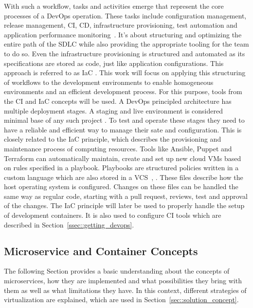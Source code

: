\documentclass[12pt, a4paper]{article}
\begin{document}
        \noindent With such a workflow, tasks and activities emerge that represent the core processes of a DevOps operation. These tasks include configuration management, release management, \ac{CI}, \ac{CD}, infrastructure provisioning, test automation and application performance monitoring~\cite{azuredevops}.  It's about structuring and optimizing the entire path of the \ac{SDLC} while also providing the appropriate tooling for the team to do so. Even the infrastructure provisioning is structured and automated as its specifications are stored as code, just like application configurations. This approach is referred to as \ac{IaC} \cite{base_devops}. This work will focus on applying this structuring of workflows to the development environments to enable homogeneous environments and an efficient development process. For this purpose, tools from the \ac{CI} and \ac{IaC} concepts will be used. \newline
        A DevOps principled architecture has multiple deployment stages. A staging and live environment is considered minimal base of any such project \cite{azuredevops}. To test and operate these stages they need to have a reliable and efficient way to manage their sate and configuration. This is closely related to the \ac{IaC} principle, which describes the provisioning and maintenance process of computing resources. Tools like Ansible, Puppet and Terraform can automatically maintain, create and set up new cloud \ac{VM}s based on rules specified in a playbook. Playbooks are structured policies written in a custom language which are also stored in a \ac{VCS}~\cite{ansible2020}, \cite{azuredevops}. These files describe how the host operating system is configured. Changes on these files can be handled the same way as regular code, starting with a pull request, reviews, test and approval of the changes. The \acl{IaC} principle will later be used to properly handle the setup of development containers. It is also used to configure \acs{CI} tools which are described in Section~\ref{ssec::getting_devops}.

    \subsection{Microservice and Container Concepts}\label{ssec::microservices}
    The following Section provides a basic understanding about the concepts of microservices, how they are implemented and what possibilities they bring with them as well as what limitations they have. In this context, different strategies of virtualization are explained, which are used in Section~\ref{sec::solution_concept}.
\end{document}
